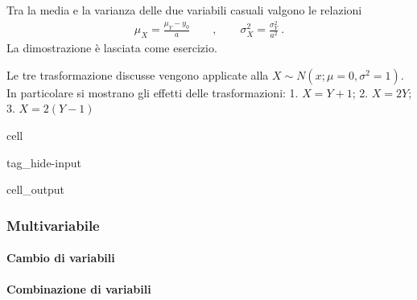 \documentclass[letterpaper,10pt,italian]{jupyterBook}
\begin{document}
\sphinxAtStartPar
Tra la media e la varianza delle due variabili casuali valgono le relazioni
\begin{equation*}
\begin{split}\mu_X = \frac{\mu_Y - y_0}{a} \qquad , \qquad \sigma^2_X = \frac{\sigma^2_Y}{a^2} \ .\end{split}
\end{equation*}
\sphinxAtStartPar
La dimostrazione è lasciata come esercizio.

\sphinxAtStartPar
Le tre trasformazione discusse vengono applicate alla {\hyperref[\detokenize{ch/statistics/pfun_continuous_examples:statistics-hs-random-variables-continuous-examples-norm}]{}} \(X \sim N(x; \mu=0, \sigma^2=1)\). In particolare si mostrano gli effetti delle trasformazioni: 1. \(X = Y + 1\); 2. \(X = 2 Y\); 3. \(X = 2 (Y - 1)\)

\begin{sphinxuseclass}{cell}
\begin{sphinxuseclass}{tag_hide-input}\begin{sphinxVerbatimOutput}

\begin{sphinxuseclass}{cell_output}
\noindent{}

\end{sphinxuseclass}\end{sphinxVerbatimOutput}

\end{sphinxuseclass}
\end{sphinxuseclass}

\subsubsection{Multi\sphinxhyphen{}variabile}
\label{\detokenize{ch/statistics/rv_pdf_transformations:multi-variabile}}

\paragraph{Cambio di variabili}
\label{\detokenize{ch/statistics/rv_pdf_transformations:cambio-di-variabili}}

\paragraph{Combinazione di variabili}
\label{\detokenize{ch/statistics/rv_pdf_transformations:combinazione-di-variabili}}
\end{document}
